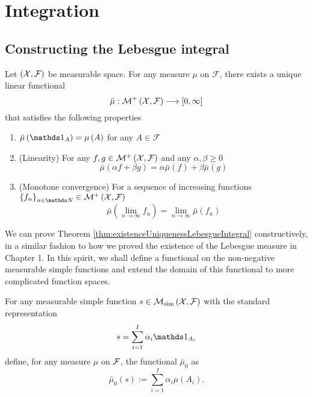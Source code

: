 
\chapter{Integration}

\section{Constructing the Lebesgue integral}
\begin{thm}
\label{thm:existenceUniquenessLebesgueIntegral}Let $\left(\mathcal{X},\mathcal{F}\right)$
be measurable space. For any measure $\mu$ on $\mathcal{F}$, there
exists a unique linear functional
\[
\bar{\mu}:\mathcal{\mathcal{M}^{+}}\left(\mathcal{X},\mathcal{F}\right)\longrightarrow\left[0,\infty\right]
\]
that satisfies the following properties

\begin{enumerate}[label=(\roman*),leftmargin=.1\linewidth,rightmargin=.4\linewidth]
	\item $ \bar{\mu}\left(\indicate_A\right) = \mu\left(A\right) $ for any $ A \in \mathcal{F} $
	\item \textnormal{(Linearity)}  For any $f,g\in \mathcal{\mathcal{M}^{+}}\left(\mathcal{X},\mathcal{F}\right)$ and any $\alpha,\beta \geq 0 $ 
	\[
				\bar{\mu}\left(\alpha f + \beta g\right) = \alpha \bar{\mu}\left(f\right) + \beta \bar{\mu}\left(g\right)                
	\]
	\item \textnormal{(Monotone convergence)} For a sequence of increasing functions $ \left\{f_n\right\}_{n\in\N} \in \mathcal{\mathcal{M}^{+}}\left(\X,\mathcal{F}\right)$ 
	\[
				\bar{\mu}\left(\lim_{n\to\infty}f_n\right) = \lim_{n\to\infty}\bar{\mu}\left(f_n\right)
	\]
\end{enumerate}
\end{thm}

We can prove Theorem \ref{thm:existenceUniquenessLebesgueIntegral}
constructively, in a similar fashion to how we proved the existence
of the Lebesgue measure in Chapter 1. In this spirit, we shall define
a functional on the non-negative measurable simple functions and extend
the domain of this functional to more complicated function spaces.
\begin{defn}
\label{def:simpleFuncIntegral}For any measurable simple function
$s\in\mathcal{M}_{\textnormal{sim}}\left(\mathcal{X},\mathcal{F}\right)$ with the standard
representation
\[
s=\sum_{i=1}^{I}\alpha_{i}\indicate_{A_{i}}
\]
define, for any measure $\mu$ on $\mathcal{F}$, the functional $\bar{\mu}_{0}$
as
\[
\bar{\mu}_{0}\left(s\right):=\sum_{i=1}^{I}\alpha_{i}\mu\left(A_{i}\right).
\]
\end{defn}

